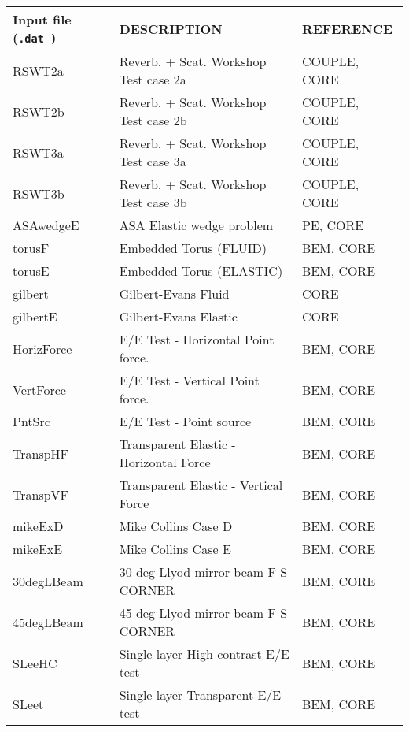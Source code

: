 \begin{table}
\begin{center}
\small
\begin{tabular}{|l|l|l|}
\hline \hline
{\bf Input file (\tt .dat \rm) } & {\bf DESCRIPTION} & {\bf REFERENCE}
 \\ \hline \hline
 RSWT2a      & Reverb. + Scat. Workshop Test case 2a  & COUPLE, CORE \\ \hline
 RSWT2b      & Reverb. + Scat. Workshop Test case 2b  & COUPLE, CORE \\ \hline
 RSWT3a      & Reverb. + Scat. Workshop Test case 3a  & COUPLE, CORE \\ \hline
 RSWT3b      & Reverb. + Scat. Workshop Test case 3b  & COUPLE, CORE \\ \hline
 ASAwedgeE   & ASA Elastic wedge problem              & PE, CORE     \\ \hline
 torusF      & Embedded Torus (FLUID)                 & BEM, CORE    \\ \hline
 torusE      & Embedded Torus (ELASTIC)               & BEM, CORE    \\ \hline
 gilbert     & Gilbert-Evans Fluid            	      & CORE         \\ \hline
 gilbertE    & Gilbert-Evans Elastic   		      & CORE         \\ \hline
 HorizForce  & E/E Test - Horizontal Point force.     & BEM, CORE    \\ \hline
 VertForce   & E/E Test - Vertical Point force.       & BEM, CORE    \\ \hline
 PntSrc      & E/E Test - Point source		      & BEM, CORE    \\ \hline
 TranspHF    & Transparent Elastic - Horizontal Force & BEM, CORE    \\ \hline
 TranspVF    & Transparent Elastic - Vertical Force   & BEM, CORE    \\ \hline
 mikeExD     & Mike Collins Case D		      & BEM, CORE    \\ \hline
 mikeExE     & Mike Collins Case E		      & BEM, CORE    \\ \hline
 30degLBeam  & 30-deg Llyod mirror beam F-S CORNER    & BEM, CORE    \\ \hline
 45degLBeam  & 45-deg Llyod mirror beam F-S CORNER    & BEM, CORE    \\ \hline
 SLeeHC      & Single-layer High-contrast E/E test    & BEM, CORE    \\ \hline
 SLeet       & Single-layer Transparent E/E test      & BEM, CORE    \\ \hline

\end{tabular}
\end{center}
\end{table}
